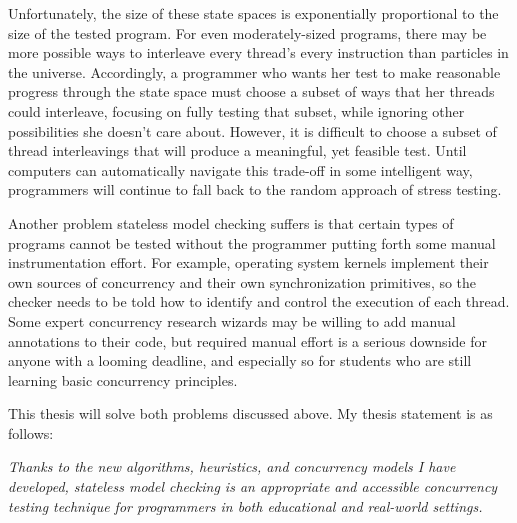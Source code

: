 \documentclass[12pt]{cmuthesis}
\begin{document}
Unfortunately, the size of these state spaces is exponentially proportional to the size of the tested program.
For even moderately-sized programs, there may be more possible ways to interleave every thread's every instruction
than particles in the universe.
Accordingly, a programmer who wants her test to make reasonable progress through the state space must choose a subset of ways that her threads could interleave,
focusing on fully testing that subset, while ignoring other possibilities she doesn't care about.
However, it is difficult to choose a subset of thread interleavings that will produce a meaningful, yet feasible test.
Until computers can automatically navigate this trade-off in some intelligent way,
programmers will continue to fall back to the random approach of stress testing.

Another problem stateless model checking suffers is that certain types of programs cannot be tested without the programmer putting forth some manual instrumentation effort.
For example, operating system kernels implement their own sources of concurrency and their own synchronization primitives,
so the checker needs to be told how to identify and control the execution of each thread.
Some expert concurrency research wizards may be willing to add manual annotations to their code,
but required manual effort is a serious downside for anyone with a looming deadline,
and especially so for students who are still learning basic concurrency principles.

This thesis will solve both problems discussed above.
My thesis statement is as follows:

\vspace{1em}

\begin{center}
	{\em Thanks to the new algorithms, heuristics, and concurrency models I have developed,
	stateless model checking is an appropriate and accessible concurrency testing technique
	for programmers in both educational and real-world settings.}
\end{center}

\vspace{1em}
\end{document}
